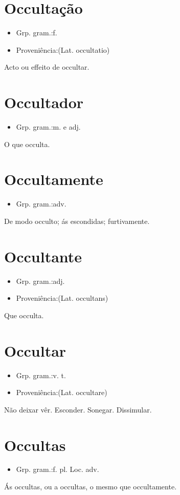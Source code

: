 \section{Occultação}
\begin{itemize}
\item {Grp. gram.:f.}
\end{itemize}
\begin{itemize}
\item {Proveniência:(Lat. \textunderscore occultatio\textunderscore )}
\end{itemize}
Acto ou effeito de occultar.
\section{Occultador}
\begin{itemize}
\item {Grp. gram.:m.  e  adj.}
\end{itemize}
O que occulta.
\section{Occultamente}
\begin{itemize}
\item {Grp. gram.:adv.}
\end{itemize}
De modo occulto; ás escondidas; furtivamente.
\section{Occultante}
\begin{itemize}
\item {Grp. gram.:adj.}
\end{itemize}
\begin{itemize}
\item {Proveniência:(Lat. \textunderscore occultans\textunderscore )}
\end{itemize}
Que occulta.
\section{Occultar}
\begin{itemize}
\item {Grp. gram.:v. t.}
\end{itemize}
\begin{itemize}
\item {Proveniência:(Lat. \textunderscore occultare\textunderscore )}
\end{itemize}
Não deixar vêr.
Esconder.
Sonegar.
Dissimular.
\section{Occultas}
\begin{itemize}
\item {Grp. gram.:f. pl. Loc. adv.}
\end{itemize}
\textunderscore Ás occultas\textunderscore , ou \textunderscore a occultas\textunderscore , o mesmo que \textunderscore occultamente\textunderscore .
